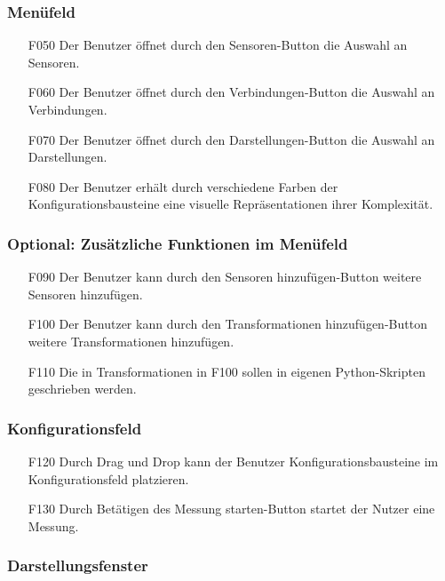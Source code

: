 \documentclass[parskip=full]{scrartcl}
\begin{document}
\subsubsection{Menüfeld}

\begin{itemize}
\item[F050] Der Benutzer öffnet durch den Sensoren-Button die Auswahl an Sensoren.
\item[F060] Der Benutzer öffnet durch den Verbindungen-Button die Auswahl an Verbindungen.
\item[F070] Der Benutzer öffnet durch den Darstellungen-Button die Auswahl an Darstellungen.
\item[F080] Der Benutzer erhält durch verschiedene Farben der Konfigurationsbausteine eine visuelle Repräsentationen ihrer Komplexität.
\end{itemize}

\subsubsection{Optional: Zusätzliche Funktionen im Menüfeld}

\begin{itemize}

\item[F090] Der Benutzer kann durch den Sensoren hinzufügen-Button weitere Sensoren hinzufügen.
\item[F100] Der Benutzer kann durch den Transformationen hinzufügen-Button weitere Transformationen hinzufügen.
\item[F110] Die in Transformationen in F100 sollen in eigenen Python-Skripten geschrieben werden.
\end{itemize}

\subsubsection{Konfigurationsfeld}

\begin{itemize}
\item[F120] Durch Drag und Drop kann der Benutzer Konfigurationsbausteine im Konfigurationsfeld platzieren.
\item[F130] Durch Betätigen des Messung starten-Button startet der Nutzer eine Messung.
\end{itemize}

\subsubsection{Darstellungsfenster}
\end{document}
